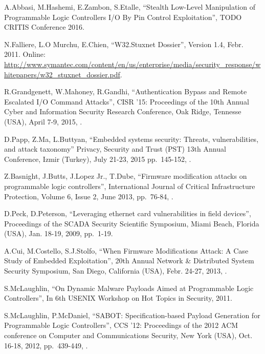\begin{thebibliography}{99}

A.Abbasi, M.Hashemi, E.Zambon, S.Etalle,
``Stealth Low-Level Manipulation of Programmable Logic Controllers I/O By Pin Control Exploitation'',
TODO CRITIS Conference 2016.

N.Falliere, L.O Murchu, E.Chien,
``W32.Stuxnet  Dossier'',
Version 1.4, Febr. 2011.
Online: \url{http://www.symantec.com/content/en/us/enterprise/media/security_response/whitepapers/w32_stuxnet_dossier.pdf}.

R.Grandgenett, W.Mahoney, R.Gandhi,
``Authentication Bypass and Remote Escalated I/O Command Attacks'',
CISR '15: Proceedings of the 10th Annual Cyber and Information Security Research Conference,
Oak Ridge, Tennesse (USA), April 7-9, 2015,
.

D.Papp, Z.Ma, L.Buttyan,
``Embedded systems security: Threats, vulnerabilities, and attack taxonomy''
Privacy, Security and Trust (PST) 13th Annual Conference,
Izmir (Turkey), July 21-23, 2015
pp.\ 145-152,
.

Z.Basnight, J.Butts, J.Lopez Jr., T.Dube,
``Firmware modification attacks on programmable logic controllers'',
International Journal of Critical Infrastructure Protection,
Volume 6, Issue 2, June 2013,
pp.\ 76-84,
.

D.Peck, D.Peterson,
``Leveraging ethernet card vulnerabilities in field devices'',
Proceedings of the SCADA Security Scientific Symposium,
Miami Beach, Florida (USA), Jan. 18-19, 2009,
pp.\ 1-19.

A.Cui, M.Costello, S.J.Stolfo,
``When Firmware Modifications Attack: A Case Study of Embedded Exploitation'',
20th Annual Network \& Distributed System Security Symposium,
San Diego, California (USA), Febr. 24-27, 2013,
.

S.McLaughlin,
``On Dynamic Malware Payloads Aimed at Programmable Logic Controllers'',
In 6th USENIX Workshop on Hot Topics in Security,
2011.

S.McLaughlin, P.McDaniel,
``SABOT: Specification-based Payload Generation for Programmable Logic Controllers'',
CCS '12: Proceedings of the 2012 ACM conference on Computer and Communications Security,
New York (USA), Oct. 16-18, 2012,
pp.\ 439-449,
.


\end{thebibliography}
